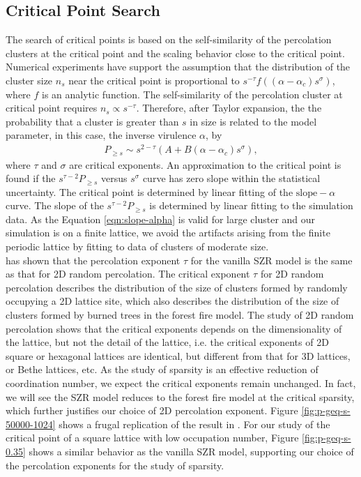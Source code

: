 \documentclass[11pt]{article}
\newcommand{\warn}{\textcolor{red}}
\begin{document}
\subsection{Critical Point Search}

The search of critical points is based on the self-similarity of the percolation clusters at the critical point and the scaling behavior close to the critical point. Numerical experiments have support the assumption that the distribution of the cluster size $n_{s}$ near the critical point is proportional to $s^{-\tau} f((\alpha - \alpha_{c})s^{\sigma})$, where $f$ is an analytic function. \cite{Stauffer2018} The self-similarity of the percolation cluster at critical point requires $n_{s} \propto s^{-\tau}$. Therefore, after Taylor expansion, the
the probability that a cluster is greater than $s$ in size is related to the model parameter, in this case, the inverse virulence $\alpha$, by
\begin{align}
    P_{\geq s} \sim s^{2 - \tau} (A + B (\alpha - \alpha_{c})s^{\sigma}),
    \label{eqn:slope-alpha}
\end{align}
where $\tau$ and $\sigma$ are critical exponents. An approximation to the critical point is found if the $s^{\tau - 2} P_{\geq s}$ versus $s^{\sigma}$ curve has zero slope within the statistical uncertainty. The critical point is determined by linear fitting of the $\text{slope} - \alpha$ curve. The slope of the $s^{\tau - 2} P_{\geq s}$ is determined by linear fitting to the simulation data. As the Equation \ref{eqn:slope-alpha} is valid for large cluster and our simulation is on a finite lattice, we avoid the artifacts arising from the finite periodic lattice by fitting to data of clusters of moderate size.\\



\cite{Zombies} has shown that the percolation exponent $\tau$ for the vanilla SZR model is the same as that for 2D random percolation. The critical exponent $\tau$ for 2D random percolation describes the distribution of the size of clusters formed by randomly occupying a 2D lattice site, which also describes the distribution of the size of clusters formed by burned trees in the forest fire model. The study of 2D random percolation shows that \cite{Stauffer2018} the critical exponents depends on the dimensionality of the lattice, but not the detail of the lattice, i.e. the critical exponents of 2D square or hexagonal lattices are identical, but different from that for 3D lattices, or Bethe lattices, etc. As the study of sparsity is an effective reduction of coordination number, we expect the critical exponents remain unchanged. In fact, we will see the SZR model reduces to the forest fire model at the critical sparsity, which further justifies our choice of 2D percolation exponent. Figure \ref{fig:p-geq-s-50000-1024} shows a frugal replication of the result in \cite{Zombies}.  For our study of the critical point of a square lattice with low occupation number, Figure \ref{fig:p-geq-s-0.35} shows a similar behavior as the vanilla SZR model, supporting our choice of the percolation exponents for the study of sparsity.\\
\end{document}
